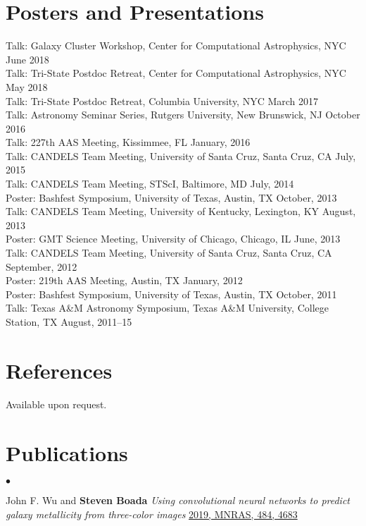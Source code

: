 \documentclass[margin,line, 11pt]{res}
\newenvironment{list2}{
  \begin{list}{$\bullet$}{%
      \setlength{\itemsep}{0in}
      \setlength{\parsep}{0in} \setlength{\parskip}{0in}
      \setlength{\topsep}{0in} \setlength{\partopsep}{0in}
      \setlength{\leftmargin}{0.2in}}}{\end{list}}
\begin{document}
\begin{resume}
\section{Posters and Presentations}
Talk: Galaxy Cluster Workshop, Center for Computational Astrophysics, NYC June 2018\\
Talk: Tri-State Postdoc Retreat, Center for Computational Astrophysics, NYC May 2018\\
Talk: Tri-State Postdoc Retreat, Columbia University, NYC March 2017\\
Talk: Astronomy Seminar Series, Rutgers University, New Brunswick, NJ October 2016\\
Talk: 227th AAS Meeting, Kissimmee, FL January, 2016\\
Talk: CANDELS Team Meeting, University of Santa Cruz, Santa Cruz, CA July, 2015\\
Talk: CANDELS Team Meeting, STScI, Baltimore, MD July, 2014\\
Poster: Bashfest Symposium, University of Texas, Austin, TX October, 2013\\
Talk: CANDELS Team Meeting, University of Kentucky, Lexington, KY August, 2013\\
Poster: GMT Science Meeting, University of Chicago, Chicago, IL June, 2013\\
Talk: CANDELS Team Meeting, University of Santa Cruz, Santa Cruz, CA September, 2012\\
Poster: 219th AAS Meeting, Austin, TX January, 2012\\
Poster: Bashfest Symposium, University of Texas, Austin, TX October, 2011\\
Talk: Texas A\&M Astronomy Symposium, Texas A\&M University, College Station, TX August, 2011--15\\

\section{References}
Available upon request.

\section{Publications}
\begin{list2}

\item John F. Wu and \textbf{Steven Boada} \emph{Using convolutional neural networks to predict galaxy metallicity from three-color images} \href{https://ui.adsabs.harvard.edu/abs/2019MNRAS.484.4683W/abstract}{2019, MNRAS, 484, 4683}


\end{list2}
\end{resume}
\end{document}
